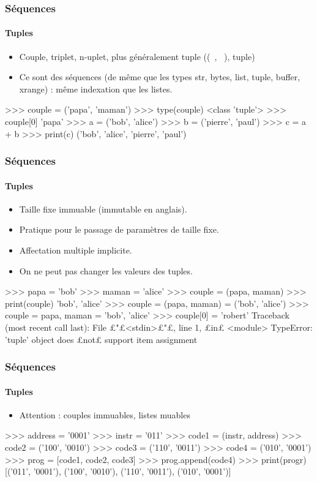 \begin{frame}[fragile]
\frametitle{Séquences}
\framesubtitle{Tuples}
\begin{itemize}
 \item Couple, triplet, n-uplet, plus généralement tuple ((\ , \ ), tuple)
 \item Ce sont des séquences (de même que les types str, bytes, list, tuple, buffer, xrange) : même indexation que les listes.
\end{itemize}
\begin{pythonConsole}
>>> couple = ('papa', 'maman')
>>> type(couple)
<class 'tuple'>
>>> couple[0]
'papa'
>>> a = ('bob', 'alice')
>>> b = ('pierre', 'paul')
>>> c = a + b
>>> print(c)
('bob', 'alice', 'pierre', 'paul')
\end{pythonConsole}
\end{frame}
\begin{frame}[fragile]
\frametitle{Séquences}
\framesubtitle{Tuples}
\begin{itemize}
 \item Taille fixe immuable (immutable en anglais). 
 \item Pratique pour le passage de paramètres de taille fixe. 
 \item Affectation multiple implicite. 
 \item On ne peut pas changer les valeurs des tuples. 
\end{itemize}
\begin{pythonConsole}
>>> papa = 'bob'
>>> maman = 'alice'
>>> couple = (papa, maman)
>>> print(couple)
'bob', 'alice'
>>> couple = (papa, maman) = ('bob', 'alice')
>>> couple = papa, maman = 'bob', 'alice'
>>> couple[0] = 'robert'
Traceback (most recent call last):
  File £"£<stdin>£"£, line 1, £in£ <module>
TypeError: 'tuple' object does £not£ support item assignment
\end{pythonConsole}
\end{frame}
\begin{frame}[fragile]
\frametitle{Séquences}
\framesubtitle{Tuples}
\begin{itemize}
 \item Attention : couples immuables, listes muables 
\end{itemize}
\begin{pythonConsole}
>>> address = '0001'
>>> instr = '011'
>>> code1 = (instr, address)
>>> code2 = ('100', '0010')
>>> code3 = ('110', '0011')
>>> code4 = ('010', '0001')
>>> prog = [code1, code2, code3]
>>> prog.append(code4)
>>> print(progr)
[('011', '0001'), ('100', '0010'), ('110', '0011'), ('010', '0001')]
\end{pythonConsole}
\end{frame}
